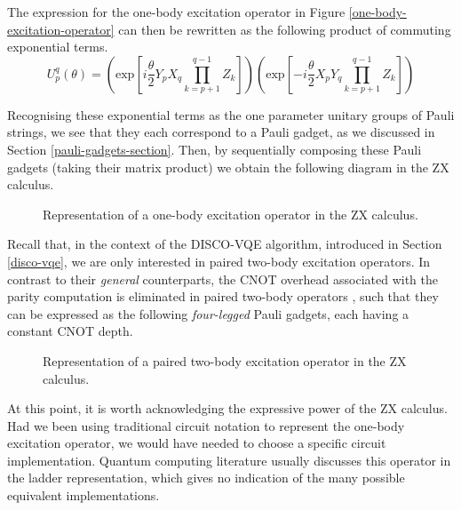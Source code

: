 The expression for the one-body excitation operator in Figure \ref{one-body-excitation-operator} can then be rewritten as the following product of commuting exponential terms.
\vspace{10pt}
\begin{equation*}
    U^q_p (\theta) =
    \left( \text{exp} \left[
    i \frac{\theta}{2} Y_p X_q \prod_{k=p+1}^{q-1} Z_k \right] \right)
    \left( \text{exp} \left[ -
    i \frac{\theta}{2} X_p Y_q \prod_{k=p+1}^{q-1} Z_k \right] \right)
\end{equation*}
\vspace{-16pt}

Recognising these exponential terms as the one parameter unitary groups of Pauli strings, we see that they each correspond to a Pauli gadget, as we discussed in Section \ref{pauli-gadgets-section}. Then, by sequentially composing these Pauli gadgets (taking their matrix product) we obtain the following diagram in the ZX calculus. 

\begin{figure}[H]
    \centering
    \caption{Representation of a one-body excitation operator in the ZX calculus.}
\end{figure}

Recall that, in the context of the DISCO-VQE algorithm, introduced in Section \ref{disco-vqe}, we are only interested in paired two-body excitation operators. In contrast to their \textit{general} counterparts, the CNOT overhead associated with the parity computation is eliminated in paired two-body operators \cite{Burton2023}, such that they can be expressed as the following \textit{four-legged} Pauli gadgets, each having a constant CNOT depth.

\begin{figure}[H]
    \centering
    \caption{Representation of a paired two-body excitation operator in the ZX calculus.}
\end{figure}

At this point, it is worth acknowledging the expressive power of the ZX calculus. Had we been using traditional circuit notation to represent the one-body excitation operator, we would have needed to choose a specific circuit implementation. Quantum computing literature usually discusses this operator in the ladder representation, which gives no indication of the many possible equivalent implementations.


